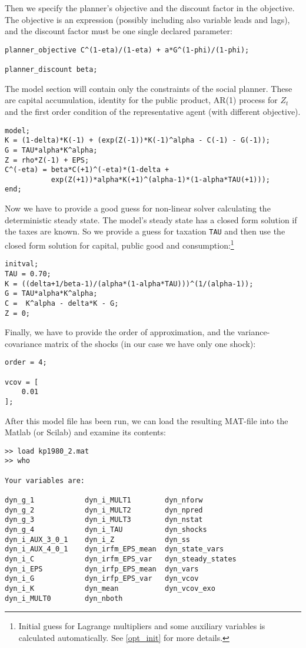 \documentclass[10pt]{article}
\begin{document}
Then we specify the planner's objective and the discount factor in the
objective. The objective is an expression (possibly including also
variable leads and lags), and the discount factor must be one single
declared parameter:
{\small
\begin{verbatim}
planner_objective C^(1-eta)/(1-eta) + a*G^(1-phi)/(1-phi);

planner_discount beta;
\end{verbatim}
}

The model section will contain only the constraints of the social
planner. These are capital accumulation, identity for the public
product, AR(1) process for $Z_t$ and the first order condition of the
representative agent (with different objective).
{\small
\begin{verbatim}
model;
K = (1-delta)*K(-1) + (exp(Z(-1))*K(-1)^alpha - C(-1) - G(-1));
G = TAU*alpha*K^alpha;
Z = rho*Z(-1) + EPS;
C^(-eta) = beta*C(+1)^(-eta)*(1-delta +
           exp(Z(+1))*alpha*K(+1)^(alpha-1)*(1-alpha*TAU(+1)));
end;
\end{verbatim}
}

Now we have to provide a good guess for non-linear solver calculating
the deterministic steady state. The model's steady state has a closed
form solution if the taxes are known. So we provide a guess for
taxation {\tt TAU} and then use the closed form solution for capital,
public good and consumption:\footnote{Initial guess for Lagrange
multipliers and some auxiliary variables is calculated automatically. See
\ref{opt_init} for more details.}
{\small
\begin{verbatim}
initval;
TAU = 0.70;
K = ((delta+1/beta-1)/(alpha*(1-alpha*TAU)))^(1/(alpha-1));
G = TAU*alpha*K^alpha;
C =  K^alpha - delta*K - G;
Z = 0;
\end{verbatim}
}

Finally, we have to provide the order of approximation, and the
variance-covariance matrix of the shocks (in our case we have only one
shock):
{\small
\begin{verbatim}
order = 4;

vcov = [
	0.01
];
\end{verbatim}
}

After this model file has been run, we can load the resulting MAT-file
into the Matlab (or Scilab) and examine its contents:
{\small
\begin{verbatim}
>> load kp1980_2.mat
>> who

Your variables are:

dyn_g_1            dyn_i_MULT1        dyn_nforw          
dyn_g_2            dyn_i_MULT2        dyn_npred          
dyn_g_3            dyn_i_MULT3        dyn_nstat          
dyn_g_4            dyn_i_TAU          dyn_shocks         
dyn_i_AUX_3_0_1    dyn_i_Z            dyn_ss             
dyn_i_AUX_4_0_1    dyn_irfm_EPS_mean  dyn_state_vars     
dyn_i_C            dyn_irfm_EPS_var   dyn_steady_states  
dyn_i_EPS          dyn_irfp_EPS_mean  dyn_vars           
dyn_i_G            dyn_irfp_EPS_var   dyn_vcov           
dyn_i_K            dyn_mean           dyn_vcov_exo       
dyn_i_MULT0        dyn_nboth          
\end{verbatim}
}
\end{document}
